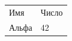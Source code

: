 \documentclass{article}
\begin{document}
\begin{tabular}{ll}Имя & Число\\ Альфа & 42\end{tabular}
\end{document}
